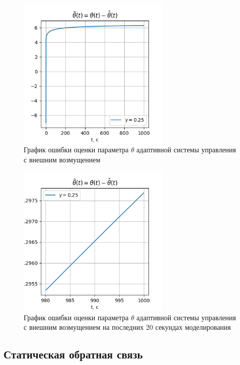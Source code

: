 \documentclass{article}
\begin{document}
\begin{figure}[h!]
  \centering
  \includegraphics[width=0.65\textwidth]{figs/1_big_theta_e.png}
  \caption{График ошибки оценки параметра $\theta$ адаптивной системы управления с внешним возмущением} 
  \label{fig:1_big_theta_e}
\end{figure}

\begin{figure}[h!]
  \centering
  \includegraphics[width=0.65\textwidth]{figs/1_small_theta_e.png}
  \caption{График ошибки оценки параметра $\theta$ адаптивной системы управления с внешним возмущением на последних 20 секундах моделирования} 
  \label{fig:1_small_theta_e}
\end{figure}
\FloatBarrier
\subsection{Статическая обратная связь}
\end{document}
